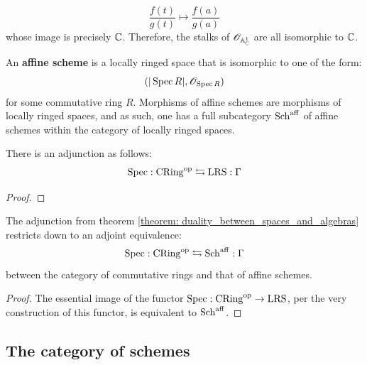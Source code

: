 \begin{example}
\begin{enumerate}
		                    $$\frac{f(t)}{g(t)} \mapsto \frac{f(a)}{g(a)}$$
	                    whose image is precisely $\mathbb{C}$. Therefore, the stalks of $\mathscr{O}_{\mathbb{A}^1_{\mathbb{C}}}$ are all isomorphic to $\mathbb{C}$.
			        \end{enumerate}
            \end{example}
        
            \begin{definition} \label{def: affine_schemes}
                An \textbf{affine scheme} is a locally ringed space that is isomorphic to one of the form:
                    $$(|\operatorname{Spec} R|, \mathscr{O}_{\operatorname{Spec} R})$$
                for some commutative ring $R$. Morphisms of affine schemes are morphisms of locally ringed spaces, and as such, one has a full subcategory $\mathrm{Sch}^{\mathrm{aff}}$ of affine schemes within the category of locally ringed spaces. 
            \end{definition}
            
            \begin{theorem} \label{theorem: duality_between_spaces_and_algebras}
                There is an adjunction as follows:
                    $$\operatorname{Spec}: \mathrm{CRing}^{\mathrm{op}} \leftrightarrows \mathrm{LRS}: \Gamma$$
            \end{theorem}
                \begin{proof}
                \end{proof}
            \begin{corollary} \label{coro: duality_between_affine_schemes_and_commutative_rings}
                The adjunction from theorem \ref{theorem: duality_between_spaces_and_algebras} restricts down to an adjoint equivalence:
                    $$\operatorname{Spec}: \mathrm{CRing}^{\mathrm{op}} \leftrightarrows \mathrm{Sch}^{\mathrm{aff}}: \Gamma$$
                between the category of commutative rings and that of affine schemes.
            \end{corollary}
                \begin{proof}
                    The essential image of the functor $\operatorname{Spec}: \mathrm{CRing}^{\mathrm{op}} \to \mathrm{LRS}$, per the very construction of this functor, is equivalent to $\mathrm{Sch}^{\mathrm{aff}}$. 
                \end{proof}

    \subsection{The category of schemes}
